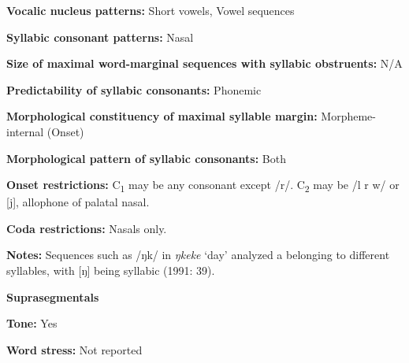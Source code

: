 \begin{styleBody}
\textbf{Vocalic nucleus patterns:} Short vowels, Vowel sequences
\end{styleBody}

\begin{styleBody}
\textbf{Syllabic consonant patterns:} Nasal
\end{styleBody}

\begin{styleBody}
\textbf{Size of maximal word{}-marginal sequences with syllabic obstruents:} N/A
\end{styleBody}

\begin{styleBody}
\textbf{Predictability of syllabic consonants:} Phonemic
\end{styleBody}

\begin{styleBody}
\textbf{Morphological constituency of maximal syllable margin:} Morpheme-internal (Onset)
\end{styleBody}

\begin{styleBody}
\textbf{Morphological pattern of syllabic consonants:} Both
\end{styleBody}

\begin{styleBody}
\textbf{Onset restrictions: }C\textsubscript{1} may be any consonant except /r/. C\textsubscript{2} may be /l r w/ or [j], allophone of palatal nasal.
\end{styleBody}

\begin{styleBody}
\textbf{Coda restrictions: }Nasals only.
\end{styleBody}

\begin{styleBody}
\textbf{Notes: }Sequences such as /ŋk/ in \textit{ŋkeke} ‘day’ analyzed a belonging to different syllables, with [ŋ] being syllabic (1991: 39).
\end{styleBody}

\begin{styleBody}
\textbf{Suprasegmentals}
\end{styleBody}

\begin{styleBody}
\textbf{Tone:} Yes
\end{styleBody}

\begin{styleBody}
\textbf{Word stress:} Not reported
\end{styleBody}


